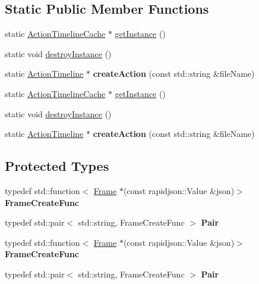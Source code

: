 \subsection*{Static Public Member Functions}
\begin{DoxyCompactItemize}
\item 
static \hyperlink{classActionTimelineCache}{Action\+Timeline\+Cache} $\ast$ \hyperlink{classActionTimelineCache_a2644d43bf6fb050a27cbf7cbb70f7e1e}{get\+Instance} ()
\item 
static void \hyperlink{classActionTimelineCache_a18e4737159c64d36347dc6382b525837}{destroy\+Instance} ()
\item 
\mbox{\label{classActionTimelineCache_a8e487651214bb0430d7f4898091a7e7c}} 
static \hyperlink{classActionTimeline}{Action\+Timeline} $\ast$ {\bfseries create\+Action} (const std\+::string \&file\+Name)
\item 
static \hyperlink{classActionTimelineCache}{Action\+Timeline\+Cache} $\ast$ \hyperlink{classActionTimelineCache_ac216999dabab041d71a107feed5498d2}{get\+Instance} ()
\item 
static void \hyperlink{classActionTimelineCache_ab615a38b54bd0f4aba091ff475fe98b7}{destroy\+Instance} ()
\item 
\mbox{\label{classActionTimelineCache_a24cab82702a2efbcc1e5cf1ff26679b3}} 
static \hyperlink{classActionTimeline}{Action\+Timeline} $\ast$ {\bfseries create\+Action} (const std\+::string \&file\+Name)
\end{DoxyCompactItemize}
\subsection*{Protected Types}
\begin{DoxyCompactItemize}
\item 
\mbox{\label{classActionTimelineCache_a42cef37fdbd419f58036dd162ef2592a}} 
typedef std\+::function$<$ \hyperlink{classFrame}{Frame} $\ast$(const rapidjson\+::\+Value \&json)$>$ {\bfseries Frame\+Create\+Func}
\item 
\mbox{\label{classActionTimelineCache_a28ed41c78e327941adb28942bbb0945f}} 
typedef std\+::pair$<$ std\+::string, Frame\+Create\+Func $>$ {\bfseries Pair}
\item 
\mbox{\label{classActionTimelineCache_a42cef37fdbd419f58036dd162ef2592a}} 
typedef std\+::function$<$ \hyperlink{classFrame}{Frame} $\ast$(const rapidjson\+::\+Value \&json)$>$ {\bfseries Frame\+Create\+Func}
\item 
\mbox{\label{classActionTimelineCache_a28ed41c78e327941adb28942bbb0945f}} 
typedef std\+::pair$<$ std\+::string, Frame\+Create\+Func $>$ {\bfseries Pair}
\end{DoxyCompactItemize}
